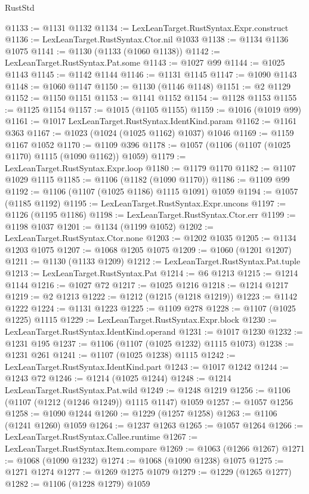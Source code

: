 \begin{lexlean}{RustStd}
\begin{coremodule}
@1133 := @1131 @1132
@1134 := LexLeanTarget.RustSyntax.Expr.construct
@1136 := LexLeanTarget.RustSyntax.Ctor.nil @1033
@1138 := @1134 @1136 @1075
@1141 := @1130 (@1133 (@1060 @1138))
@1142 := LexLeanTarget.RustSyntax.Pat.some
@1143 := @1027 @99
@1144 := @1025 @1143
@1145 := @1142 @1144
@1146 := @1131 @1145
@1147 := @1090 @1143
@1148 := @1060 @1147
@1150 := @1130 (@1146 @1148)
@1151 := @2 @1129
@1152 := @1150 @1151
@1153 := @1141 @1152
@1154 := @1128 @1153
@1155 := @1125 @1154
@1157 := @1015 (@1105 @1155)
@1159 := @1016 (@1019 @99)
@1161 := @1017 LexLeanTarget.RustSyntax.IdentKind.param
@1162 := @1161 @363
@1167 := @1023 (@1024 (@1025 @1162) @1037) @1046
@1169 := @1159 @1167 @1052
@1170 := @1109 @396
@1178 := @1057 (@1106 (@1107 (@1025 @1170) @1115 (@1090 @1162)) @1059)
@1179 := LexLeanTarget.RustSyntax.Expr.loop
@1180 := @1179 @1170
@1182 := @1107 @1029 @1115
@1185 := @1106 (@1182 (@1090 @1170))
@1186 := @1109 @99
@1192 := @1106 (@1107 (@1025 @1186) @1115 @1091) @1059
@1194 := @1057 (@1185 @1192)
@1195 := LexLeanTarget.RustSyntax.Expr.uncons
@1197 := @1126 (@1195 @1186)
@1198 := LexLeanTarget.RustSyntax.Ctor.err
@1199 := @1198 @1037
@1201 := @1134 (@1199 @1052)
@1202 := LexLeanTarget.RustSyntax.Ctor.none
@1203 := @1202 @1035
@1205 := @1134 @1203 @1075
@1207 := @1068 @1205 @1075
@1209 := @1060 (@1201 @1207)
@1211 := @1130 (@1133 @1209)
@1212 := LexLeanTarget.RustSyntax.Pat.tuple
@1213 := LexLeanTarget.RustSyntax.Pat
@1214 := @6 @1213
@1215 := @1214 @1144
@1216 := @1027 @72
@1217 := @1025 @1216
@1218 := @1214 @1217
@1219 := @2 @1213
@1222 := @1212 (@1215 (@1218 @1219))
@1223 := @1142 @1222
@1224 := @1131 @1223
@1225 := @1109 @278
@1228 := @1107 (@1025 @1225) @1115
@1229 := LexLeanTarget.RustSyntax.Expr.block
@1230 := LexLeanTarget.RustSyntax.IdentKind.operand
@1231 := @1017 @1230
@1232 := @1231 @195
@1237 := @1106 (@1107 (@1025 @1232) @1115 @1073)
@1238 := @1231 @261
@1241 := @1107 (@1025 @1238) @1115
@1242 := LexLeanTarget.RustSyntax.IdentKind.part
@1243 := @1017 @1242
@1244 := @1243 @72
@1246 := @1214 (@1025 @1244)
@1248 := @1214 LexLeanTarget.RustSyntax.Pat.wild
@1249 := @1248 @1219
@1256 := @1106 (@1107 (@1212 (@1246 @1249)) @1115 @1147) @1059
@1257 := @1057 @1256
@1258 := @1090 @1244
@1260 := @1229 (@1257 @1258)
@1263 := @1106 (@1241 @1260) @1059
@1264 := @1237 @1263
@1265 := @1057 @1264
@1266 := LexLeanTarget.RustSyntax.Callee.runtime
@1267 := LexLeanTarget.RustSyntax.Item.compare
@1269 := @1063 (@1266 @1267)
@1271 := @1068 (@1090 @1232)
@1274 := @1068 (@1090 @1238) @1075
@1275 := @1271 @1274
@1277 := @1269 @1275 @1079
@1279 := @1229 (@1265 @1277)
@1282 := @1106 (@1228 @1279) @1059

\end{coremodule}
\end{lexlean}
